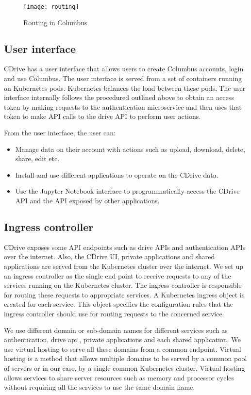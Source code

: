 \begin{figure}[t]
  \caption{Routing in Columbus}
  \centering
  \texttt{[image: routing]}
\end{figure}

\subsection{User interface}
CDrive has a user interface that allows users to create Columbus accounts, login and use Columbus.
The user interface is served from a set of containers running on Kubernetes pods. Kubernetes
balances the load between these pods. The user interface internally follows the procedured outlined
above to obtain an access token by making requests to the authentication microservice and then uses
that token to make API calls to the drive API to perform user actions. 

From the user interface, the user can:
\begin{itemize}
  \item Manage data on their account with actions such as upload, download, delete, share, edit etc.
  \item Install and use different applications to operate on the CDrive data.
  \item Use the Jupyter Notebook interface to programmatically access the CDrive API and the API 
    exposed by other applications.
\end{itemize}

\subsection{Ingress controller}
CDrive exposes some API endpoints such as drive APIs and authentication APIs over the internet. 
Also, the CDrive UI, private applications and shared applications are served from the Kubernetes 
cluster over the internet. We set up an ingress controller as the single end point to receive 
requests to any of the services running on the Kubernetes cluster. The ingress controller is 
responsible for routing these requests to appropriate services. A Kubernetes ingress object is 
created for each service. This object specifies the configuration rules that the ingress controller
should use for routing requests to the concerned service.


We use different domain or sub-domain names for different services such as authentication, drive api
, private applications and each shared application. We use virtual hosting to serve all these 
domains from a common endpoint. Virtual hosting is a method that allows multiple domains to be 
served by a common pool of servers or in our case, by a single common Kubernetes cluster. Virtual 
hosting allows services to share server resources such as memory and processor cycles without 
requiring all the services to use the same domain name. 


